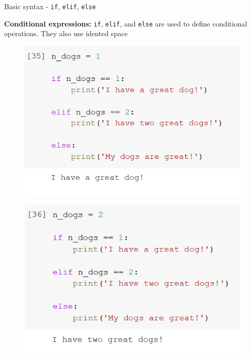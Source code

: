 \documentclass[aspectratio=169]{beamer}
\begin{document}
\begin{frame}{Basic syntax - \texttt{if}, \texttt{elif}, \texttt{else}}

       \textbf{Conditional expressions:}
	\texttt{if}, \texttt{elif}, and \texttt{else} are used to define conditional operations. They also use idented space

	\begin{multicols}{3}

		\begin{figure}
			\centering
			\includegraphics[width=\linewidth]{img/if.png}
		\end{figure}
		\begin{figure}
			\centering
			\includegraphics[width=\linewidth]{img/elif.png}
		\end{figure}
		\begin{figure}
			\centering

\end{figure}
\end{multicols}
\end{frame}
\end{document}
